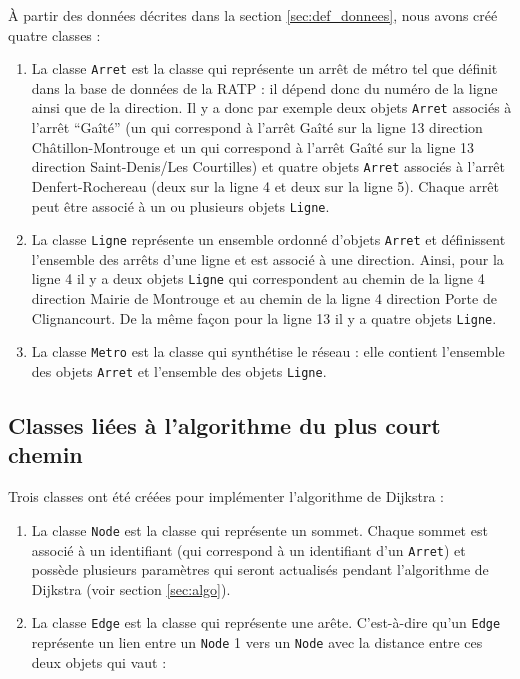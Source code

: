 \documentclass[,french]{article}
\begin{document}
À partir des données décrites dans la section \ref{sec:def_donnees},
nous avons créé quatre classes :

\begin{enumerate}
\def\labelenumi{\arabic{enumi}.}
\item
  La classe \texttt{Arret} est la classe qui représente un arrêt de
  métro tel que définit dans la base de données de la RATP : il dépend
  donc du numéro de la ligne ainsi que de la direction. Il y a donc par
  exemple deux objets \texttt{Arret} associés à l'arrêt ``Gaîté'' (un
  qui correspond à l'arrêt Gaîté sur la ligne 13 direction
  Châtillon-Montrouge et un qui correspond à l'arrêt Gaîté sur la ligne
  13 direction Saint-Denis/Les Courtilles) et quatre objets
  \texttt{Arret} associés à l'arrêt Denfert-Rochereau (deux sur la ligne
  4 et deux sur la ligne 5). Chaque arrêt peut être associé à un ou
  plusieurs objets \texttt{Ligne}.
\item
  La classe \texttt{Ligne} représente un ensemble ordonné d'objets
  \texttt{Arret} et définissent l'ensemble des arrêts d'une ligne et est
  associé à une direction. Ainsi, pour la ligne 4 il y a deux objets
  \texttt{Ligne} qui correspondent au chemin de la ligne 4 direction
  Mairie de Montrouge et au chemin de la ligne 4 direction Porte de
  Clignancourt. De la même façon pour la ligne 13 il y a quatre objets
  \texttt{Ligne}.
\item
  La classe \texttt{Metro} est la classe qui synthétise le réseau : elle
  contient l'ensemble des objets \texttt{Arret} et l'ensemble des objets
  \texttt{Ligne}.
\end{enumerate}

\hypertarget{classes-liuxe9es-uxe0-lalgorithme-du-plus-court-chemin}{%
\subsection{Classes liées à l'algorithme du plus court
chemin}\label{classes-liuxe9es-uxe0-lalgorithme-du-plus-court-chemin}}

Trois classes ont été créées pour implémenter l'algorithme de Dijkstra :

\begin{enumerate}
\def\labelenumi{\arabic{enumi}.}
\item
  La classe \texttt{Node} est la classe qui représente un sommet. Chaque
  sommet est associé à un identifiant (qui correspond à un identifiant
  d'un \texttt{Arret}) et possède plusieurs paramètres qui seront
  actualisés pendant l'algorithme de Dijkstra (voir section
  \ref{sec:algo}).
\item
  La classe \texttt{Edge} est la classe qui représente une arête.
  C'est-à-dire qu'un \texttt{Edge} représente un lien entre un
  \texttt{Node} 1 vers un \texttt{Node} avec la distance entre ces deux
  objets qui vaut :
\end{enumerate}
\end{document}
